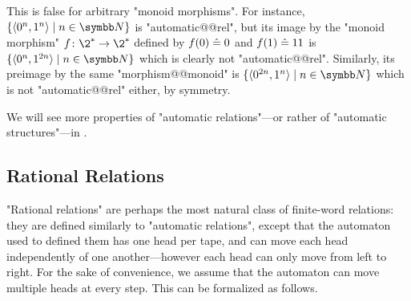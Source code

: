 This is false for arbitrary "monoid morphisms". For instance, $\set{\tup{0^n, 1^n} \mid n \in \N}$
is "automatic@@rel", but its image by the "monoid morphism" $f\colon \2^* \to \2^*$ defined by
$f(0) \mathrel{\hat{=}} 0$ and $f(1) \mathrel{\hat{=}} 11$ is $\set{\tup{0^n, 1^{2n}} \mid n\in \N}$ which is clearly not 
"automatic@@rel". Similarly, its preimage by the same "morphism@@monoid" is
$\set{\tup{0^{2n}, 1^{n}} \mid n \in \N}$ which is not "automatic@@rel" either, by symmetry.

We will see more properties of "automatic relations"---or rather of "automatic structures"---in
.

\subsection{Rational Relations}
\label{sec:prelim-rational-relations}

"Rational relations" are perhaps the most natural class of finite-word relations:
they are defined similarly to "automatic relations", except that
the automaton used to defined them has one head per tape, and can move each head
independently of one another---however each head can only move from left to right.
For the sake of convenience, we assume that the automaton can move multiple heads at every step.
This can be formalized as follows.

